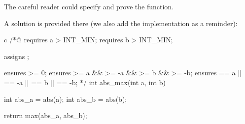 The careful reader could specify and prove the 
function.

A solution is provided there (we also add the implementation as a
reminder):



\begin{CodeBlock}{c}
/*@
  requires a > INT_MIN;
  requires b > INT_MIN;

  assigns \nothing;

  ensures \result >= 0;
  ensures \result >= a && \result >= -a && \result >= b && \result >= -b;
  ensures \result == a || \result == -a || \result == b || \result == -b;
*/
int abs_max(int a, int b){
  int abs_a = abs(a);
  int abs_b = abs(b);

  return max(abs_a, abs_b);
}
\end{CodeBlock}
